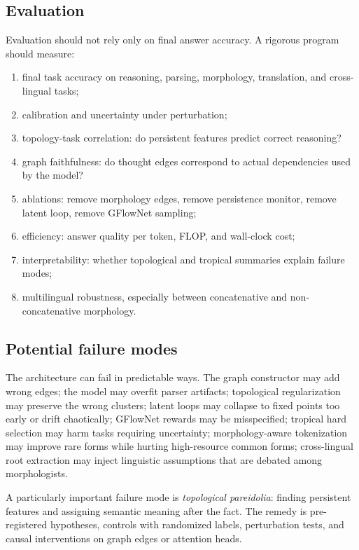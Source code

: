 \documentclass[11pt]{article}
\newcommand{\1}{\mathbf{1}}
\begin{document}
\subsection{Evaluation}

Evaluation should not rely only on final answer accuracy. A rigorous program should measure:
\begin{enumerate}
\item final task accuracy on reasoning, parsing, morphology, translation, and cross-lingual tasks;
\item calibration and uncertainty under perturbation;
\item topology-task correlation: do persistent features predict correct reasoning?
\item graph faithfulness: do thought edges correspond to actual dependencies used by the model?
\item ablations: remove morphology edges, remove persistence monitor, remove latent loop, remove GFlowNet sampling;
\item efficiency: answer quality per token, FLOP, and wall-clock cost;
\item interpretability: whether topological and tropical summaries explain failure modes;
\item multilingual robustness, especially between concatenative and non-concatenative morphology.
\end{enumerate}

\subsection{Potential failure modes}

The architecture can fail in predictable ways. The graph constructor may add wrong edges; the model may overfit parser artifacts; topological regularization may preserve the wrong clusters; latent loops may collapse to fixed points too early or drift chaotically; GFlowNet rewards may be misspecified; tropical hard selection may harm tasks requiring uncertainty; morphology-aware tokenization may improve rare forms while hurting high-resource common forms; cross-lingual root extraction may inject linguistic assumptions that are debated among morphologists.

A particularly important failure mode is \emph{topological pareidolia}: finding persistent features and assigning semantic meaning after the fact. The remedy is pre-registered hypotheses, controls with randomized labels, perturbation tests, and causal interventions on graph edges or attention heads.
\end{document}
